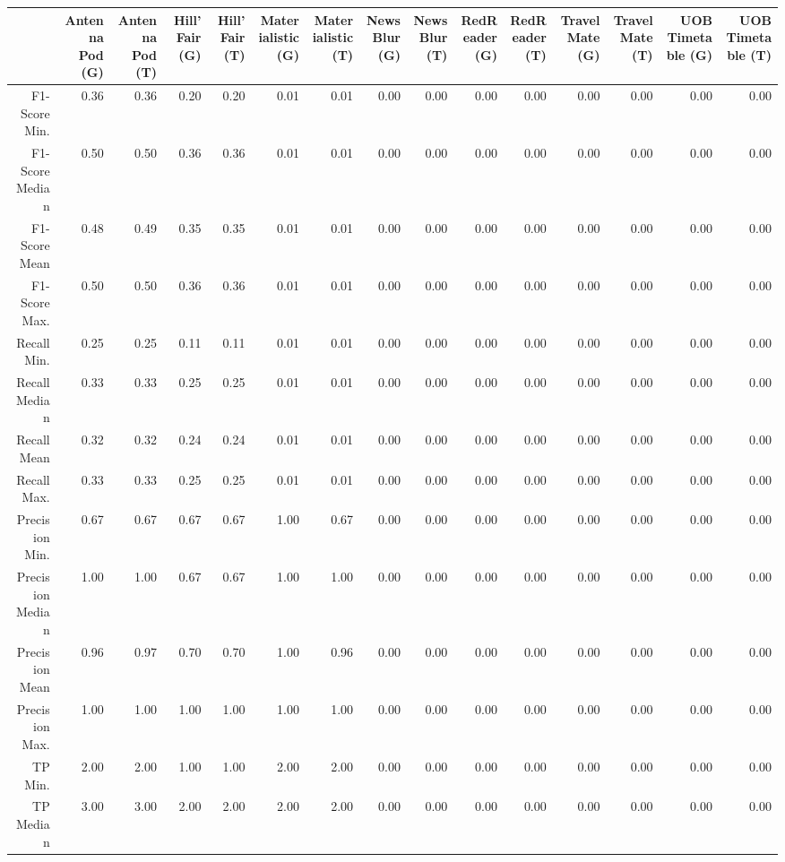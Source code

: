 \begin{table}[ht]
\centering
\begin{tabular}{rrrrrrrrrrrrrrr}
  \hline
 & Antenna Pod (G) & Antenna Pod (T) & Hill'Fair (G) & Hill'Fair (T) & Materialistic (G) & Materialistic (T) & NewsBlur (G) & NewsBlur (T) & RedReader (G) & RedReader (T) & Travel Mate (G) & Travel Mate (T) & UOB Timetable (G) & UOB Timetable (T) \\ 
  \hline
F1-Score Min. & 0.36 & 0.36 & 0.20 & 0.20 & 0.01 & 0.01 & 0.00 & 0.00 & 0.00 & 0.00 & 0.00 & 0.00 & 0.00 & 0.00 \\ 
  F1-Score Median & 0.50 & 0.50 & 0.36 & 0.36 & 0.01 & 0.01 & 0.00 & 0.00 & 0.00 & 0.00 & 0.00 & 0.00 & 0.00 & 0.00 \\ 
  F1-Score Mean & 0.48 & 0.49 & 0.35 & 0.35 & 0.01 & 0.01 & 0.00 & 0.00 & 0.00 & 0.00 & 0.00 & 0.00 & 0.00 & 0.00 \\ 
  F1-Score Max. & 0.50 & 0.50 & 0.36 & 0.36 & 0.01 & 0.01 & 0.00 & 0.00 & 0.00 & 0.00 & 0.00 & 0.00 & 0.00 & 0.00 \\ 
  Recall Min. & 0.25 & 0.25 & 0.11 & 0.11 & 0.01 & 0.01 & 0.00 & 0.00 & 0.00 & 0.00 & 0.00 & 0.00 & 0.00 & 0.00 \\ 
  Recall Median & 0.33 & 0.33 & 0.25 & 0.25 & 0.01 & 0.01 & 0.00 & 0.00 & 0.00 & 0.00 & 0.00 & 0.00 & 0.00 & 0.00 \\ 
  Recall Mean & 0.32 & 0.32 & 0.24 & 0.24 & 0.01 & 0.01 & 0.00 & 0.00 & 0.00 & 0.00 & 0.00 & 0.00 & 0.00 & 0.00 \\ 
  Recall Max. & 0.33 & 0.33 & 0.25 & 0.25 & 0.01 & 0.01 & 0.00 & 0.00 & 0.00 & 0.00 & 0.00 & 0.00 & 0.00 & 0.00 \\ 
  Precision Min. & 0.67 & 0.67 & 0.67 & 0.67 & 1.00 & 0.67 & 0.00 & 0.00 & 0.00 & 0.00 & 0.00 & 0.00 & 0.00 & 0.00 \\ 
  Precision Median & 1.00 & 1.00 & 0.67 & 0.67 & 1.00 & 1.00 & 0.00 & 0.00 & 0.00 & 0.00 & 0.00 & 0.00 & 0.00 & 0.00 \\ 
  Precision Mean & 0.96 & 0.97 & 0.70 & 0.70 & 1.00 & 0.96 & 0.00 & 0.00 & 0.00 & 0.00 & 0.00 & 0.00 & 0.00 & 0.00 \\ 
  Precision Max. & 1.00 & 1.00 & 1.00 & 1.00 & 1.00 & 1.00 & 0.00 & 0.00 & 0.00 & 0.00 & 0.00 & 0.00 & 0.00 & 0.00 \\ 
  TP Min. & 2.00 & 2.00 & 1.00 & 1.00 & 2.00 & 2.00 & 0.00 & 0.00 & 0.00 & 0.00 & 0.00 & 0.00 & 0.00 & 0.00 \\ 
  TP Median & 3.00 & 3.00 & 2.00 & 2.00 & 2.00 & 2.00 & 0.00 & 0.00 & 0.00 & 0.00 & 0.00 & 0.00 & 0.00 & 0.00 \\ 

\end{tabular}
\end{table}
